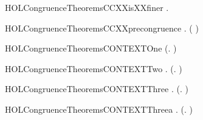 \newcommand{\HOLCongruenceTheoremsCCXXisXXcoarsestYY}{\UseVerbatim{HOLCongruenceTheoremsCCXXisXXcoarsestYY}}
\begin{SaveVerbatim}{HOLCongruenceTheoremsCCXXisXXfiner}
\HOLTokenTurnstile{} \HOLSymConst{\HOLTokenForall{}}.    
\end{SaveVerbatim}
\newcommand{\HOLCongruenceTheoremsCCXXisXXfiner}{\UseVerbatim{HOLCongruenceTheoremsCCXXisXXfiner}}
\begin{SaveVerbatim}{HOLCongruenceTheoremsCCXXprecongruence}
\HOLTokenTurnstile{} \HOLSymConst{\HOLTokenForall{}}.   \HOLSymConst{\HOLTokenImp{}}  ( )
\end{SaveVerbatim}
\newcommand{\HOLCongruenceTheoremsCCXXprecongruence}{\UseVerbatim{HOLCongruenceTheoremsCCXXprecongruence}}
\begin{SaveVerbatim}{HOLCongruenceTheoremsCONTEXTOne}
\HOLTokenTurnstile{}  (\HOLTokenLambda{}. )
\end{SaveVerbatim}
\newcommand{\HOLCongruenceTheoremsCONTEXTOne}{\UseVerbatim{HOLCongruenceTheoremsCONTEXTOne}}
\begin{SaveVerbatim}{HOLCongruenceTheoremsCONTEXTTwo}
\HOLTokenTurnstile{} \HOLSymConst{\HOLTokenForall{}}.  (\HOLTokenLambda{}. )
\end{SaveVerbatim}
\newcommand{\HOLCongruenceTheoremsCONTEXTTwo}{\UseVerbatim{HOLCongruenceTheoremsCONTEXTTwo}}
\begin{SaveVerbatim}{HOLCongruenceTheoremsCONTEXTThree}
\HOLTokenTurnstile{} \HOLSymConst{\HOLTokenForall{}} .   \HOLSymConst{\HOLTokenImp{}}  (\HOLTokenLambda{}.  )
\end{SaveVerbatim}
\newcommand{\HOLCongruenceTheoremsCONTEXTThree}{\UseVerbatim{HOLCongruenceTheoremsCONTEXTThree}}
\begin{SaveVerbatim}{HOLCongruenceTheoremsCONTEXTThreea}
\HOLTokenTurnstile{} \HOLSymConst{\HOLTokenForall{}}.  (\HOLTokenLambda{}. )
\end{SaveVerbatim}
\newcommand{\HOLCongruenceTheoremsCONTEXTThreea}{\UseVerbatim{HOLCongruenceTheoremsCONTEXTThreea}}

